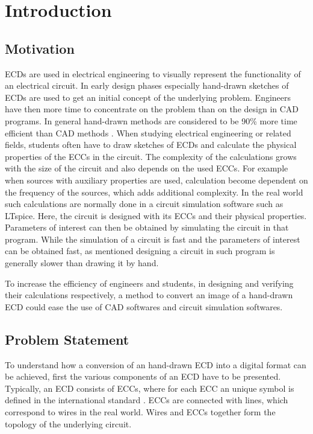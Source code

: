 \chapter{Introduction}

\section{Motivation}


\acp{ECD} are used in electrical engineering to visually represent the functionality of an electrical circuit.
In early design phases especially hand-drawn sketches of \acp{ECD} are used to get an initial concept of the underlying problem.
Engineers have then more time to concentrate on the problem than on the design in \ac{CAD} programs.
In general hand-drawn methods are considered to be 90\% more time efficient than \ac{CAD} methods \cite{ecd_ctxindependentsvm}.
When studying electrical engineering or related fields, students often have to draw sketches of \acp{ECD} and calculate the physical properties of the \acp{ECC} in the circuit.
The complexity of the calculations grows with the size of the circuit and also depends on the used \acp{ECC}.
For example when sources with auxiliary properties are used, calculation become dependent on the frequency of the sources, which adds additional complexity.
In the real world such calculations are normally done in a circuit simulation software such as LTspice.
Here, the circuit is designed with its \acp{ECC} and their physical properties.
Parameters of interest can then be obtained by simulating the circuit in that program.
While the simulation of a circuit is fast and the parameters of interest can be obtained fast, as mentioned designing a circuit in such program is generally slower than drawing it by hand.

To increase the efficiency of engineers and students, in designing and verifying their calculations respectively, a method to convert an image of a hand-drawn \ac{ECD} could ease the use of \ac{CAD} softwares and circuit simulation softwares.

\section{Problem Statement}
\label{sec:problem_statement}

To understand how a conversion of an hand-drawn \ac{ECD} into a digital format can be achieved, first the various components of an \ac{ECD} have to be presented.
Typically, an \ac{ECD} consists of \acp{ECC}, where for each \ac{ECC} an unique symbol is defined in the international standard \cite{iec60617}.
\acp{ECC} are connected with lines, which correspond to wires in the real world.
Wires and \acp{ECC} together form the topology of the underlying circuit.

